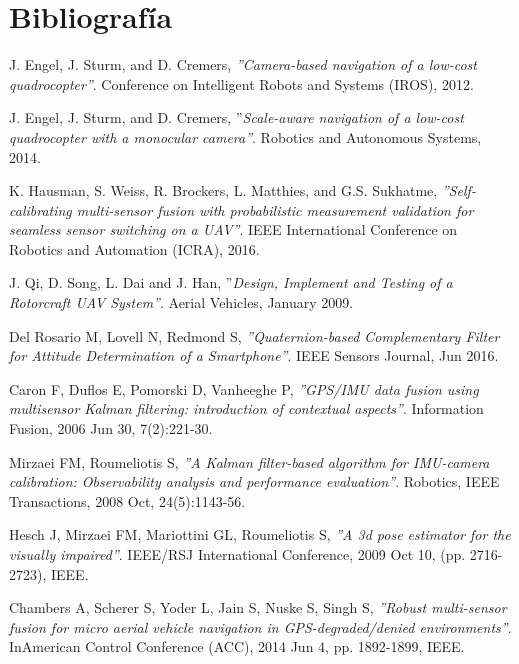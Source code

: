 \documentclass[a4paper,10pt]{article}
\numberwithin{equation}{section}
\begin{document}
\newpage
\section{Bibliografía}
\label{sec:7_biblio}

\begin{thebibliography}{9}
    J. Engel, J. Sturm, and D. Cremers,
    \textit{''Camera-based navigation of a low-cost quadrocopter''}.
    Conference on Intelligent Robots and Systems (IROS),
    2012.
    
    J. Engel, J. Sturm, and D. Cremers,
    ''\textit{Scale-aware navigation of a low-cost quadrocopter with a monocular camera''}.
    Robotics and Autonomous Systems, 
    2014.

    K. Hausman, S. Weiss, R. Brockers, L. Matthies, and G.S. Sukhatme,
    \textit{''Self-calibrating multi-sensor fusion with probabilistic measurement validation for seamless sensor switching on a UAV''}.
    IEEE International Conference on Robotics and Automation (ICRA),
    2016.

    J. Qi, D. Song, L. Dai and J. Han,
    ''\textit{Design, Implement and Testing of a Rotorcraft UAV System''}.
    Aerial Vehicles, 
    January 2009.

    Del Rosario M, Lovell N, Redmond S,
    \textit{''Quaternion-based Complementary Filter for Attitude Determination of a Smartphone''}.
    IEEE Sensors Journal,
    Jun 2016.

    Caron F, Duflos E, Pomorski D, Vanheeghe P,
    \textit{''GPS/IMU data fusion using multisensor Kalman filtering: introduction of contextual aspects''}.
    Information Fusion,
    2006 Jun 30,
    7(2):221-30.
    
    Mirzaei FM, Roumeliotis S,
    \textit{''A Kalman filter-based algorithm for IMU-camera calibration: Observability analysis and performance evaluation''}.
    Robotics, IEEE Transactions,
    2008 Oct,
    24(5):1143-56.

    Hesch J, Mirzaei FM, Mariottini GL, Roumeliotis S,
    \textit{''A 3d pose estimator for the visually impaired''}.
    IEEE/RSJ International Conference,
    2009 Oct 10,
    (pp. 2716-2723),
    IEEE.
    
    Chambers A, Scherer S, Yoder L, Jain S, Nuske S, Singh S,
    \textit{''Robust multi-sensor fusion for micro aerial vehicle navigation in GPS-degraded/denied environments''}.
    InAmerican Control Conference (ACC),
    2014 Jun 4, 
    pp. 1892-1899, IEEE.


\end{thebibliography}
\end{document}
